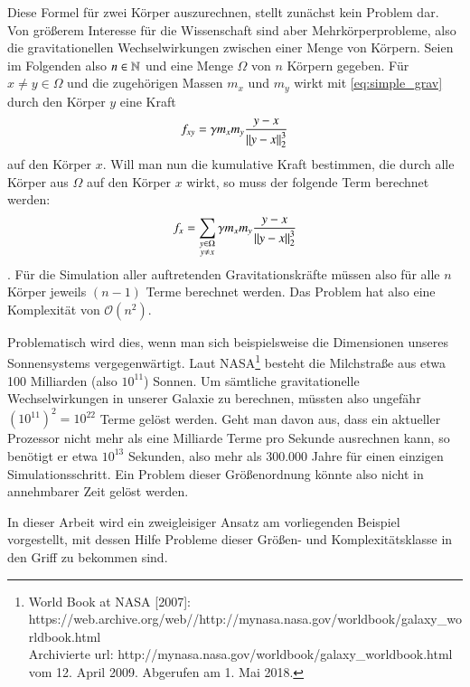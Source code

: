     Diese Formel für zwei Körper auszurechnen, stellt zunächst kein Problem dar. Von größerem Interesse für die Wissenschaft sind aber Mehrkörperprobleme, also die gravitationellen 
    Wechselwirkungen zwischen einer Menge von Körpern. Seien im Folgenden also $n \in \mathbb{N}$ und eine Menge $\Omega$ von $n$ Körpern gegeben.
    Für $x \neq y \in \Omega$ und die zugehörigen Massen $m_x$ und $m_y$ wirkt mit \autoref{eq:simple_grav} durch den Körper $y$ eine Kraft 
    \begin{equation}
      f_{xy} = \gamma m_x m_y \frac{y - x}{\left\lVert y - x\right\rVert^3_2}
      \label{eq:multi_grav}
    \end{equation}
    auf den Körper $x$. Will man nun die kumulative Kraft bestimmen, die durch alle Körper aus $\Omega$ auf den Körper $x$ wirkt, so muss der folgende Term berechnet werden:
    \begin{equation}
      f_x = \sum_{\substack{y \in \Omega \\ y \neq x}} \gamma m_x m_y \frac{y - x}{\left\lVert y - x\right\rVert^3_2}
      \label{eq:sum_grav}
    \end{equation}
    \citep{wissrech}.
    Für die Simulation aller auftretenden Gravitationskräfte müssen also für alle $n$ Körper jeweils $(n-1)$ Terme berechnet werden. Das Problem hat also eine Komplexität von
    $\mathcal{O}(n^2)$.
    
    Problematisch wird dies, wenn man sich beispielsweise die Dimensionen unseres Sonnensystems vergegenwärtigt. Laut NASA\footnote{
    World Book at NASA [2007]: 
    https://web.archive.org/\-web//\-http://mynasa.nasa.gov/\-worldbook/\-galaxy\_worldbook.html\\
    Archivierte url: http://mynasa.nasa.gov/worldbook/galaxy\_worldbook.html vom 12. April 2009. Abgerufen am 1. Mai 2018.} besteht die Milchstraße aus etwa 100 Milliarden
    (also $10^{11}$) Sonnen. Um sämtliche gravitationelle Wechselwirkungen in unserer Galaxie zu berechnen, müssten also ungefähr $(10^{11})^2 = 10^{22}$ Terme gelöst werden. Geht man 
    davon aus, dass ein aktueller Prozessor nicht mehr als eine Milliarde Terme pro Sekunde ausrechnen kann, so benötigt er etwa $10^{13}$ Sekunden, also mehr als 300.000 Jahre für 
    einen einzigen Simulationsschritt. Ein Problem dieser Größenordnung könnte also nicht in annehmbarer Zeit gelöst werden. \citep{wissrech} 
    
    In dieser Arbeit wird ein zweigleisiger Ansatz am vorliegenden Beispiel vorgestellt, mit dessen Hilfe Probleme dieser Größen- und Komplexitätsklasse in den Griff zu bekommen sind.
    

